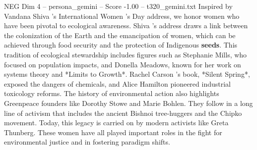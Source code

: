 \begin{textsample}{NEG Dim 4 – persona\_gemini – Score -1.00 – t320\_gemini.txt}  \label{ex:f4_neg_009}
Inspired by Vandana Shiva 's International Women ’s Day address, we honor women who have been pivotal to ecological awareness.
Shiva ’s address draws a link between the colonization of the Earth and the emancipation of women, which can be achieved through food security and the protection of Indigenous \textbf{seeds}.
This tradition of ecological stewardship includes figures such as Stephanie Mills, who focused on population impacts, and Donella Meadows, known for her work on systems theory and *Limits to Growth*.
Rachel Carson ’s book, *Silent Spring*, exposed the dangers of chemicals, and Alice Hamilton pioneered industrial toxicology reforms.
The history of environmental action also highlights Greenpeace founders like Dorothy Stowe and Marie Bohlen.
They follow in a long line of activism that includes the ancient Bishnoi tree-huggers and the Chipko movement.
Today, this legacy is carried on by modern activists like Greta Thunberg.
These women have all played important roles in the fight for environmental justice and in fostering paradigm shifts.

\end{textsample}
